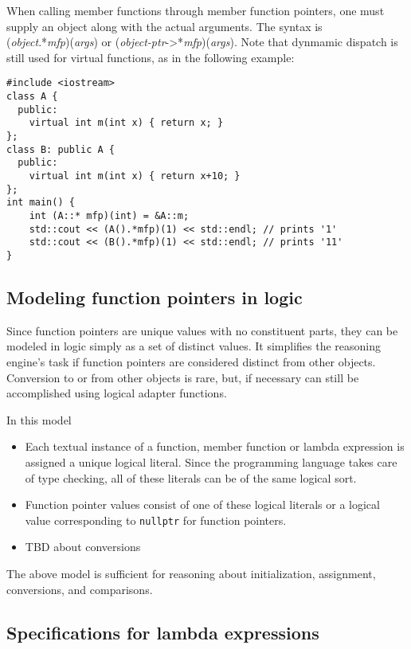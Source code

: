 {When calling member functions through member function pointers, one must supply an object along with the actual arguments. The syntax is \\
(\emph{object}.*\emph{mfp})(\emph{args}) or
(\emph{object-ptr}->*\emph{mfp})(\emph{args}).
Note that dynmamic dispatch is still used for virtual functions, as in the following example:
\begin{lstlisting}
#include <iostream>
class A {
  public:
    virtual int m(int x) { return x; }
};
class B: public A {
  public:
    virtual int m(int x) { return x+10; }
};
int main() {
    int (A::* mfp)(int) = &A::m;
    std::cout << (A().*mfp)(1) << std::endl; // prints '1'
    std::cout << (B().*mfp)(1) << std::endl; // prints '11'
}
\end{lstlisting} 
 
\subsection{Modeling function pointers in logic}
\label{sec:modelingfp}
 
 Since function pointers are unique values with no constituent parts, they can be modeled in logic simply as a set of distinct values. It simplifies the reasoning engine's task if
 function pointers are considered distinct from other objects.
 Conversion to or from other objects is rare, but, if necessary can still be accomplished using logical adapter functions.
 
 In this model
 \begin{itemize}
 	\item Each textual instance of a function, member function or lambda expression is assigned a unique logical literal.
 	Since the programming language takes care of type checking,
 	all of these literals can be of the same logical sort.
 	\item Function pointer values consist of one of these logical literals or a logical value corresponding to 
 	\lstinline|nullptr| for function pointers.
 	\item TBD about conversions
 \end{itemize}
The above model is sufficient for reasoning about initialization, assignment, conversions, and comparisons.

\subsection{Specifications for lambda expressions}
\label{sec:lambdaspecs}

}
